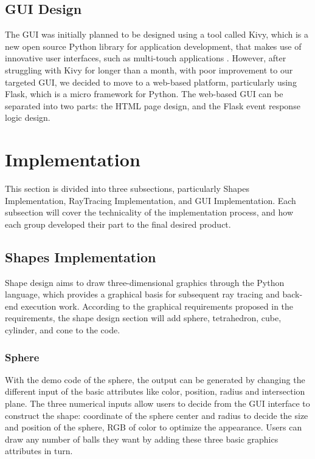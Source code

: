 \documentclass[a4paper, 12pt]{article}
\begin{document}
\subsection{GUI Design}
The GUI was initially planned to be designed using a tool called Kivy, which is a new open source Python library for application development, that makes use of innovative user interfaces, such as multi-touch applications \cite{kivy}. However, after struggling with Kivy for longer than a month, with poor improvement to our targeted GUI, we decided to move to a web-based platform, particularly using Flask, which is a micro framework for Python. The web-based GUI can be separated into two parts: the HTML page design, and the Flask event response logic design.


\section{Implementation}
This section is divided into three subsections, particularly Shapes Implementation, RayTracing Implementation, and GUI Implementation. Each subsection will cover the technicality of the implementation process, and how each group developed their part to the final desired product.

\subsection{Shapes Implementation}
Shape design aims to draw three-dimensional graphics through the Python language, which provides a graphical basis for subsequent ray tracing and back-end execution work. According to the graphical requirements proposed in the requirements, the shape design section will add sphere, tetrahedron, cube, cylinder, and cone to the code.

\subsubsection{Sphere}
With the demo code of the sphere, the output can be generated by changing the different input of the basic attributes like color, position, radius and intersection plane. The three numerical inputs allow users to decide from the GUI interface to construct the shape: coordinate of the sphere center and radius to decide the size and position of the sphere, RGB of color to optimize the appearance. Users can draw any number of balls they want by adding these three basic graphics attributes in turn.
\end{document}
